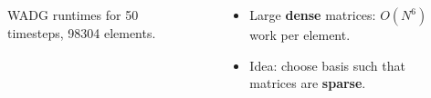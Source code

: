 \documentclass[compress]{beamer}
\begin{document}
{\begin{columns}
\begin{column}{.55\textwidth}
\begin{figure}
\caption*{\scriptsize WADG runtimes for 50 timesteps, 98304 elements.}
\end{figure}
\end{column}
\begin{column}{.45\textwidth}
\vspace{-2em}
\begin{itemize}
\item Large \textbf{dense} matrices: $O(N^6)$ work per element.
\vspace{1em}
\item Idea: choose basis such that matrices are \textbf{sparse}.
\end{itemize}
\end{column}
\end{columns}
}
\end{document}
